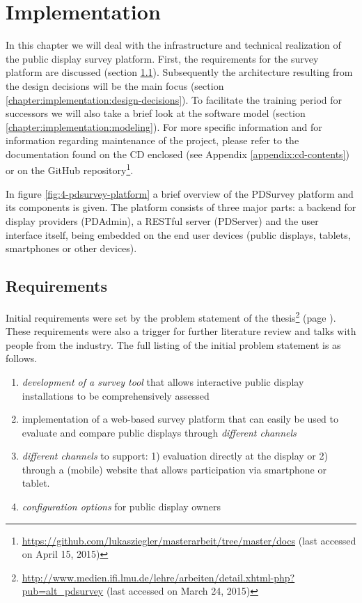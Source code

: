 \section{Implementation}
\label{chapter:implementation}

	In this chapter we will deal with the infrastructure and technical realization of the public display survey platform. First, the requirements for the survey platform are discussed (section \ref{chapter:implementation:requirements}). Subsequently the architecture resulting from the design decisions will be the main focus (section \ref{chapter:implementation:design-decisions}). To facilitate the training period for successors we will also take a brief look at the software model (section \ref{chapter:implementation:modeling}). For more specific information and for information regarding maintenance of the project, please refer to the documentation found on the CD enclosed (see Appendix \ref{appendix:cd-contents}) or on the GitHub repository\footnote{\url{https://github.com/lukasziegler/masterarbeit/tree/master/docs} (last accessed on April 15, 2015)}.

	In figure \ref{fig:4-pdsurvey-platform} a brief overview of the PDSurvey platform and its components is given. The platform consists of three major parts: a backend for display providers (PDAdmin), a RESTful server (PDServer) and the user interface itself, being embedded on the end user devices (public displays, tablets, smartphones or other devices). 





\subsection{Requirements}
\label{chapter:implementation:requirements}

	Initial requirements were set by the problem statement of the thesis\footnote{\url{http://www.medien.ifi.lmu.de/lehre/arbeiten/detail.xhtml-php?pub=alt_pdsurvey} (last accessed on March 24, 2015)} (page \pageref{aufgabenstellung}). These requirements were also a trigger for further literature review and talks with people from the industry. The full listing of the initial problem statement is as follows.

	\begin{enumerate}[itemsep=0pt] 
	\item \textit{development of a survey tool} that allows interactive public display installations to be comprehensively assessed 
	\item implementation of a web-based survey platform that can easily be used to evaluate and compare public displays through \textit{different channels} 
	\item \textit{different channels} to support: 1) evaluation directly at
	the display or 2) through a (mobile) website that allows participation via smartphone or tablet.
	\item \textit{configuration options} for public display owners
	\end{enumerate}

